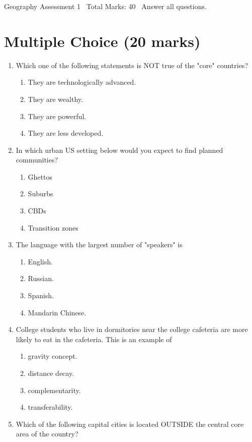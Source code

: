 \documentclass[12pt]{article}
\begin{document}
\begin{center}
Geography Assessment 1 \
Total Marks: 40 \
Answer all questions.
\end{center}

\section*{Multiple Choice (20 marks)}
\begin{enumerate}[label=\arabic*.]
\item Which one of the following statements is NOT true of the "core" countries?
\begin{enumerate}[label=(\alph*)]
    \item They are technologically advanced.
    \item They are wealthy.
    \item They are powerful.
    \item They are less developed.
\end{enumerate}
\item In which urban US setting below would you expect to find planned communities?
\begin{enumerate}[label=(\alph*)]
    \item Ghettos
    \item Suburbs
    \item CBDs
    \item Transition zones
\end{enumerate}
\item The language with the largest number of "speakers" is
\begin{enumerate}[label=(\alph*)]
    \item English.
    \item Russian.
    \item Spanish.
    \item Mandarin Chinese.
\end{enumerate}
\item College students who live in dormitories near the college cafeteria are more likely to eat in the cafeteria. This is an example of
\begin{enumerate}[label=(\alph*)]
    \item gravity concept.
    \item distance decay.
    \item complementarity.
    \item transferability.
\end{enumerate}
\item Which of the following capital cities is located OUTSIDE the central core area of the country?

\end{enumerate}
\end{document}
